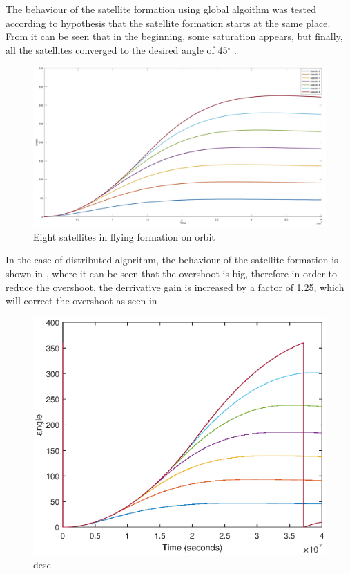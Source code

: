 The behaviour of the satellite formation using global algoithm was tested according to hypothesis that the satellite formation starts at the same place. From  it can be seen that in the beginning, some saturation appears, but finally, all the satellites converged to the desired angle of 45$^{\circ}$ .
\begin{figure}[H]
	\centering
	\includegraphics[width=1\linewidth]{figures/form_sat}
	\caption{Eight satellites in flying formation on orbit}
	\label{fig:forr}
\end{figure}
In the case of distributed algorithm, the behaviour of the satellite formation is shown in , where it can be seen that the overshoot is big, therefore in order to reduce the overshoot, the derrivative gain is increased by a factor of 1.25, which will correct the overshoot as seen in 
\begin{figure}[H]
	\centering
	\includegraphics[width=0.8\linewidth]{figures/da1}
	\caption{desc}
	\label{fig:da1}
\end{figure}
